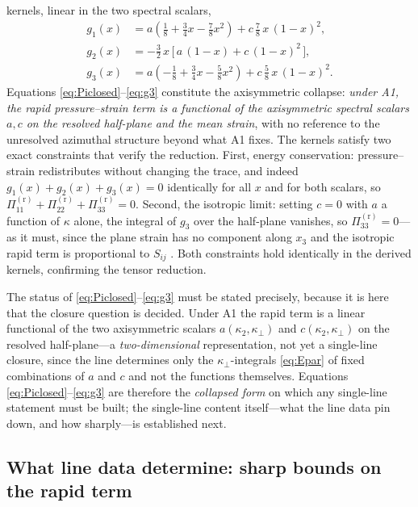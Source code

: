 \documentclass[11pt,a4paper]{article}
\begin{document}
kernels, linear in the two spectral scalars,
\begin{align}
  g_{1}(x) &= a\!\left(\tfrac18 + \tfrac34 x - \tfrac78 x^2\right)
            + c\,\tfrac78\,x\,(1-x)^2, \label{eq:g1}\\[2pt]
  g_{2}(x) &= -\tfrac32\,x\,\bigl[\,a\,(1-x) + c\,(1-x)^2\,\bigr],
            \label{eq:g2}\\[2pt]
  g_{3}(x) &= a\!\left(-\tfrac18 + \tfrac34 x - \tfrac58 x^2\right)
            + c\,\tfrac58\,x\,(1-x)^2. \label{eq:g3}
\end{align}
Equations \eqref{eq:Piclosed}--\eqref{eq:g3} constitute the axisymmetric collapse:
\emph{under A1, the rapid pressure--strain term is a
functional of the axisymmetric spectral scalars $a,c$ on the resolved
half-plane and the mean strain}, with no reference to the unresolved azimuthal
structure beyond what A1 fixes. The kernels satisfy two exact constraints that
verify the reduction. First, energy conservation: pressure--strain
redistributes without changing the trace, and indeed
$g_1(x)+g_2(x)+g_3(x)=0$ identically for all $x$ and for both scalars, so
$\Pi^{(\mathrm r)}_{11}+\Pi^{(\mathrm r)}_{22}+\Pi^{(\mathrm r)}_{33}=0$.
Second, the isotropic limit: setting $c=0$ with $a$ a function of $\kappa$
alone, the integral of $g_3$ over the half-plane vanishes, so
$\Pi^{(\mathrm r)}_{33}=0$---as it must, since the plane strain has no
component along $x_3$ and the isotropic rapid term is proportional to $S_{ij}$
\citep{Crow1968}. Both constraints hold identically in the derived kernels,
confirming the tensor reduction.

The status of \eqref{eq:Piclosed}--\eqref{eq:g3} must be stated precisely,
because it is here that the closure question is decided. Under A1 the rapid
term is a linear functional of the two axisymmetric scalars
$a(\kappa_2,\kappa_\perp)$ and $c(\kappa_2,\kappa_\perp)$ on the resolved
half-plane---a \emph{two-dimensional} representation, not yet a single-line
closure, since the line determines only the $\kappa_\perp$-integrals
\eqref{eq:Epar} of fixed combinations of $a$ and $c$ and not the functions
themselves. Equations \eqref{eq:Piclosed}--\eqref{eq:g3} are therefore the
\emph{collapsed form} on which any single-line statement must be built; the
single-line content itself---what the line data pin down, and how
sharply---is established next.

\subsection{What line data determine: sharp bounds on the rapid term}
\label{sec:bounds}
\end{document}
